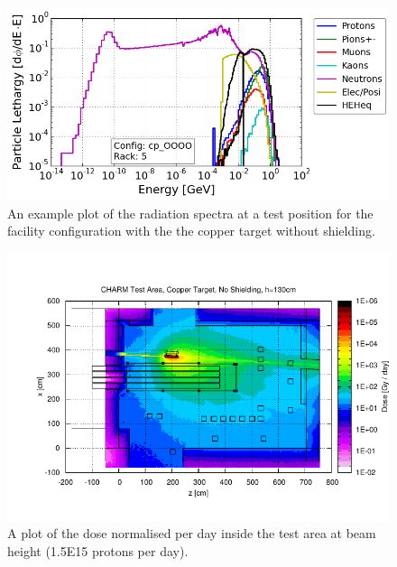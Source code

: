 \begin{figure}[!ht]
	\centering
	\includegraphics[scale=0.6]{./images/spectra_cp_OOOO_r5}
	\caption{An example plot of the radiation spectra at a test position for the facility configuration with the the copper target without shielding.}
	\label{fig:cpOOOO_spectra}
\end{figure}

\begin{figure}[!ht]
	\centering
	\includegraphics[width=\textwidth]{./images/dose_test_area_cpOOOO}
	\caption{A plot of the dose normalised per day inside the test area at beam height (1.5E15 protons per day).}
	\label{fig:cpOOOO_dosemap}
\end{figure}

